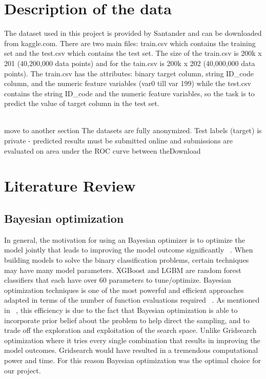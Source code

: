\documentclass[journal,twoside,web]{ieeecolor}
\begin{document}

\section{Description of the data}
The dataset used in this project is provided by Santander and can be downloaded from kaggle.com. There are two main files: train.csv which contains the training set and the test.csv which contains the test set. The size of the train.csv is 200k x 201 (40,200,000 data points) and for the tain.csv is 200k x 202 (40,000,000 data points). The train.csv has the attributes: binary target column, string ID\_code column, and the numeric feature variables (var0 till var 199) while the test.csv contains the string ID\_code and the numeric feature variables, so the task is to predict the value of target column in the test set. 


\leavevmode\\
move to another section
The datasets are fully anonymized. Test labels (target) is private - predicted results must be submitted online and submissions are evaluated on area under the ROC curve between theDownload






\section{Literature Review}

\subsection{Bayesian optimization}
In general, the motivation for using an Bayesian optimizer is to optimize the model jointly that leads to improving the model outcome significantly ~\cite{shahriari2016taking}. When building models to solve the binary classification problems, certain techniques may have many model parameters. XGBoost and LGBM are random forest classifiers that each have over 60 parameters to tune/optimize. Bayesian optimization techniques is one of the most powerful and efficient approaches adapted in terms of the number of function evaluations required ~\cite{brochu2010tutorial}. As mentioned in  ~\cite{brochu2010tutorial}, this efficiency is due to the fact that Bayesian optimization is able to incorporate prior belief about the problem to help direct the sampling, and to trade off the exploration and exploitation of the search space. Unlike Gridsearch optimization where it tries every single combination that results in improving the model outcomes. Gridsearch would have resulted in a tremendous computational power and time. For this reason Bayesian optimization was the optimal choice for our project. 
\end{document}
